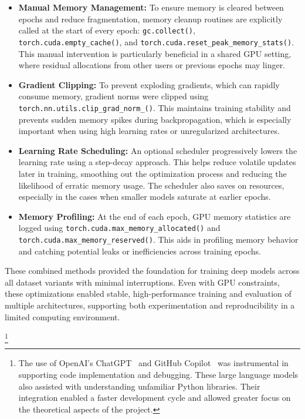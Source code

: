 \begin{itemize}
    \item \textbf{Manual Memory Management:} To ensure memory is cleared between epochs and reduce fragmentation, memory cleanup routines are explicitly called at the start of every epoch: \texttt{gc.collect()}, \texttt{torch.cuda.empty\_cache()}, and \texttt{torch.cuda.reset\_peak\_memory\_stats()}. This manual intervention is particularly beneficial in a shared GPU setting, where residual allocations from other users or previous epochs may linger.

    \item \textbf{Gradient Clipping:} To prevent exploding gradients, which can rapidly consume memory, gradient norms were clipped using \texttt{torch.nn.utils.clip\_grad\_norm\_()}. This maintains training stability and prevents sudden memory spikes during backpropagation, which is especially important when using high learning rates or unregularized architectures.

    \item \textbf{Learning Rate Scheduling:} An optional scheduler progressively lowers the learning rate using a step-decay approach. This helps reduce volatile updates later in training, smoothing out the optimization process and reducing the likelihood of erratic memory usage. The scheduler also saves on resources, especially in the cases when smaller models saturate at earlier epochs.

    \item \textbf{Memory Profiling:} At the end of each epoch, GPU memory statistics are logged using \texttt{torch.cuda.max\_memory\_allocated()} and \texttt{torch.cuda.max\_memory\_reserved()}. This aids in profiling memory behavior and catching potential leaks or inefficiencies across training epochs. 
\end{itemize}

These combined methods provided the foundation for training deep models across all dataset variants with minimal interruptions. Even with GPU constraints, these optimizations enabled stable, high-performance training and evaluation of multiple architectures, supporting both experimentation and reproducibility in a limited computing environment.

\footnote{The use of OpenAI's ChatGPT~\cite{chatgpt2025} and GitHub Copilot~\cite{github_copilot} was instrumental in supporting code implementation and debugging. These large language models also assisted with understanding unfamiliar Python libraries. Their integration enabled a faster development cycle and allowed greater focus on the theoretical aspects of the project.}
